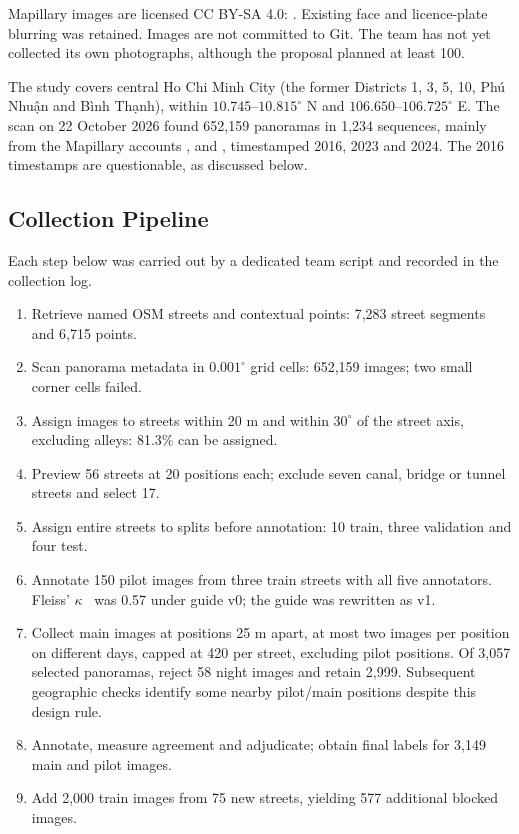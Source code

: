 Mapillary images are licensed CC BY-SA 4.0: \cc. Existing face and licence-plate blurring was retained. Images are not committed to Git. The team has not yet collected its own photographs, although the proposal planned at least 100.

The study covers central Ho Chi Minh City (the former Districts 1, 3, 5, 10, Phú Nhuận and Bình Thạnh), within $10.745$--$10.815^\circ$ N and $106.650$--$106.725^\circ$ E. The scan on 22 October 2026 found 652,159 panoramas in 1,234 sequences, mainly from the Mapillary accounts ,  and , timestamped 2016, 2023 and 2024. The 2016 timestamps are questionable, as discussed below.

\subsection{Collection Pipeline}
Each step below was carried out by a dedicated team script and recorded in the collection log.
\begin{enumerate}
\item Retrieve named OSM streets and contextual points: 7,283 street segments and 6,715 points.
\item Scan panorama metadata in $0.001^\circ$ grid cells: 652,159 images; two small corner cells failed.
\item Assign images to streets within 20 m and within $30^\circ$ of the street axis, excluding alleys: 81.3\% can be assigned.
\item Preview 56 streets at 20 positions each; exclude seven canal, bridge or tunnel streets and select 17.
\item Assign entire streets to splits before annotation: 10 train, three validation and four test.
\item Annotate 150 pilot images from three train streets with all five annotators. Fleiss' $\kappa$~\cite{fleiss1971kappa} was 0.57 under guide v0; the guide was rewritten as v1.
\item Collect main images at positions 25 m apart, at most two images per position on different days, capped at 420 per street, excluding pilot positions. Of 3,057 selected panoramas, reject 58 night images and retain 2,999. Subsequent geographic checks identify some nearby pilot/main positions despite this design rule.
\item Annotate, measure agreement and adjudicate; obtain final labels for 3,149 main and pilot images.
\item Add 2,000 train images from 75 new streets, yielding 577 additional blocked images.
\end{enumerate}

